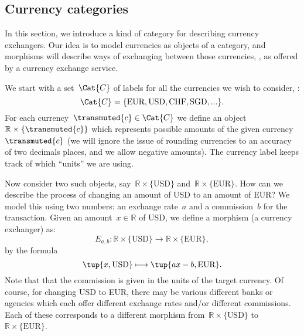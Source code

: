 \subsection{Currency categories}
\label{sec:currency_cat}
In this section, we introduce a kind of category for describing currency exchangers. Our idea is to model currencies as objects of a category, and morphisms will describe ways of exchanging between those currencies, , as offered by a currency exchange service. 

We start with a set~$\Cat{C}$ of labels for all the currencies we wish to consider, :
\begin{equation*}
    \Cat{C} = \{ \text{EUR}, \text{USD}, \text{CHF}, \text{SGD}, ... \}.
\end{equation*}
For each currency~$\transmuted{c} \in \Cat{C}$ we define an object~$\mathbb{R} \times \{\transmuted{c}\}$ which represents possible amounts of the given currency~$\transmuted{c}$ (we will ignore the issue of rounding currencies to an accuracy of two decimals places, and we allow negative amounts). The currency label keeps track of which ``units'' we are using.

Now consider two such objects, say~$\mathbb{R} \times \{\text{USD}\}$ and~$\mathbb{R} \times \{\text{EUR}\}$. How can we describe the process of changing an amount of USD to an amount of EUR? We model this using two numbers: an exchange rate~$a$ and a commission~$b$ for the transaction. Given an amount~$x \in \mathbb{R}$ of USD, we define a morphism (a currency exchanger) as:
\begin{equation*}
E_{a,b} \colon \mathbb{R} \times \{\text{USD}\} \rightarrow \mathbb{R} \times \{\text{EUR}\},
\end{equation*}
by the formula
\begin{equation*}
\tup{x, \text{USD}} \longmapsto \tup{ax - b, \text{EUR}}. 
\end{equation*}
Note that that the commission is given in the units of the target currency. Of course, for changing USD to EUR, there may be various different banks or agencies which each offer different exchange rates and/or different commissions. Each of these corresponds to a different morphism from~$\mathbb{R} \times \{\text{USD}\}$ to~$\mathbb{R} \times \{\text{EUR}\}$.

